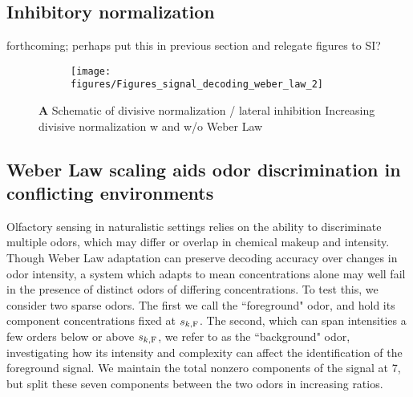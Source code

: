 


\subsection{Inhibitory normalization}



{\color{blue} forthcoming; perhaps put this in previous section and relegate figures to SI?}





\begin{figure}
	\begin{subfigure}[t]{\linewidth}
		\texttt{[image: figures/Figures\_signal\_decoding\_weber\_law\_2]}
		\label{fig:divisive_normalization_a}
	\end{subfigure}
	\begin{subfigure}[t]{\linewidth}
		\label{fig:divisive_normalization_b}
	\end{subfigure}
	\caption{\textbf{A} Schematic of divisive normalization / lateral inhibition  Increasing divisive normalization w and w/o Weber Law}
	\label{fig:divisive_normalization}
\end{figure}






\subsection{Weber Law scaling aids odor discrimination in conflicting environments}


Olfactory sensing in naturalistic settings relies on the ability to discriminate multiple odors, which may differ or overlap in chemical makeup and intensity. Though Weber Law adaptation can preserve decoding accuracy over changes in odor intensity, a system which adapts to mean concentrations alone may well fail in the presence of distinct odors of differing concentrations. To test this, we consider two sparse odors. The first we call the ``foreground" odor, and hold its component concentrations fixed at $s_{k, \text F}$. The second, which can span intensities a few orders below or above $s_{k, \text F}$, we refer to as the ``background" odor, investigating how its intensity and complexity can affect the identification of the foreground signal. We maintain the total nonzero components of the signal at 7, but split these seven components between the two odors in increasing ratios. 

